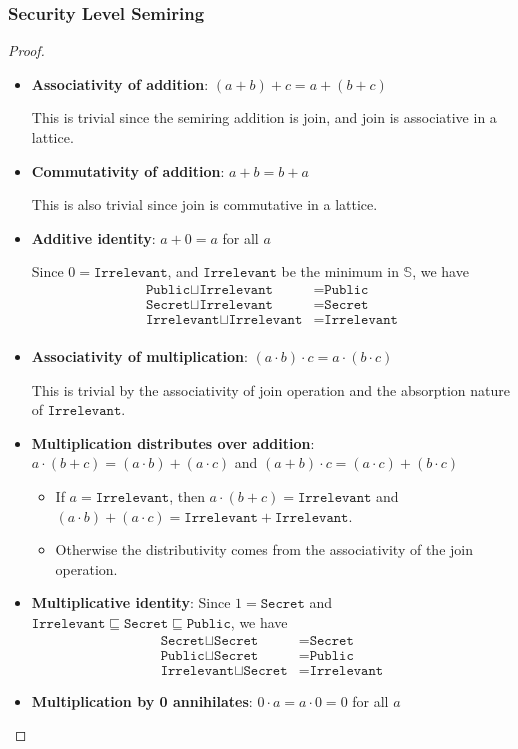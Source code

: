 \documentclass[conference]{IEEEtran}
\newcommand\public{\texttt{Public}}
\newcommand\secret{\texttt{Secret}}
\newcommand\irrele{\texttt{Irrelevant}}
\newcommand\secure{\mathbb{S}}
\begin{document}
\subsubsection{Security Level Semiring}
\label{app-b}
\begin{proof}\leavevmode
	\begin{itemize}
		\item \textbf{Associativity of addition}: $(a+b)+c=a+(b+c)$
		
		This is trivial since the semiring addition is join, and join is associative in a lattice.
		\item \textbf{Commutativity of addition}: $a+b=b+a$
		
		This is also trivial since join is commutative in a lattice.
		\item \textbf{Additive identity}: $a+0=a$ for all $a$
		
		Since $0=\irrele$, and $\irrele$ be the minimum in $\secure$, we have
		\begin{equation}
			\begin{aligned}
				\public\sqcup\irrele&=\public\\
				\secret\sqcup\irrele&=\secret\\
				\irrele\sqcup\irrele&=\irrele\\			
			\end{aligned}
		\end{equation}
		\item \textbf{Associativity of multiplication}: $(a\cdot b)\cdot c=a\cdot (b\cdot c)$
		
		This is trivial by the associativity of join operation and the absorption nature of $\irrele$.
		
		\item \textbf{Multiplication distributes over addition}: $a\cdot(b+c)=(a\cdot b)+(a\cdot c)$ and $(a+b)\cdot c=(a\cdot c)+(b\cdot c)$
		
		\begin{itemize}
			\item If $a=\irrele$, then $a\cdot(b+c)=\irrele$ and $(a\cdot b)+(a\cdot c)=\irrele+\irrele$.
			\item Otherwise the distributivity comes from the associativity of the join operation.
		\end{itemize}
		
		\item \textbf{Multiplicative identity}: Since $1=\secret$ and $\irrele\sqsubseteq\secret\sqsubseteq\public$, we have
		\begin{equation}
			\begin{aligned}
				\secret\sqcup\secret&=\secret\\
				\public\sqcup\secret&=\public\\
				\irrele\sqcup\secret&=\irrele
			\end{aligned}
		\end{equation}
		\item \textbf{Multiplication by 0 annihilates}: $0\cdot a=a\cdot 0=0$ for all $a$
		

\end{itemize}
\end{proof}
\end{document}
